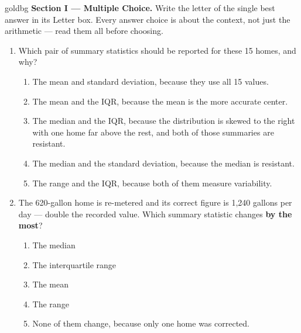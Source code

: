 \documentclass[12pt]{article}
\begin{document}
\vspace{0.10in}

\boxguard[16]
\begin{headlinebox}{goldbg}
\small
\textbf{Section I --- Multiple Choice.} Write the letter of the single best answer in its Letter box. Every answer choice is
about the context, not just the arithmetic --- read them all before choosing.
\end{headlinebox}

\vspace{0.10in}

\begin{enumerate}[leftmargin=1.9em, itemsep=0.10in]

  \item Which pair of summary statistics should be reported for these 15 homes, and why?
        \begin{enumerate}[label=\textbf{(\Alph*)}, leftmargin=2.2em, itemsep=2pt]
          \item The mean and standard deviation, because they use all 15 values.
          \item The mean and the IQR, because the mean is the more accurate center.
          \item The median and the IQR, because the distribution is skewed to the right with one
                home far above the rest, and both of those summaries are resistant.
          \item The median and the standard deviation, because the median is resistant.
          \item The range and the IQR, because both of them measure variability.
                \hfill{}
        \end{enumerate}

  \boxguard[9]
  \item The 620-gallon home is re-metered and its correct figure is 1{,}240 gallons per day
        --- double the recorded value. Which summary statistic changes \textbf{by the most}?
        \begin{enumerate}[label=\textbf{(\Alph*)}, leftmargin=2.2em, itemsep=2pt]
          \item The median
          \item The interquartile range
          \item The mean
          \item The range
          \item None of them change, because only one home was corrected.
                \hfill{}
        \end{enumerate}


\end{enumerate}
\end{document}
